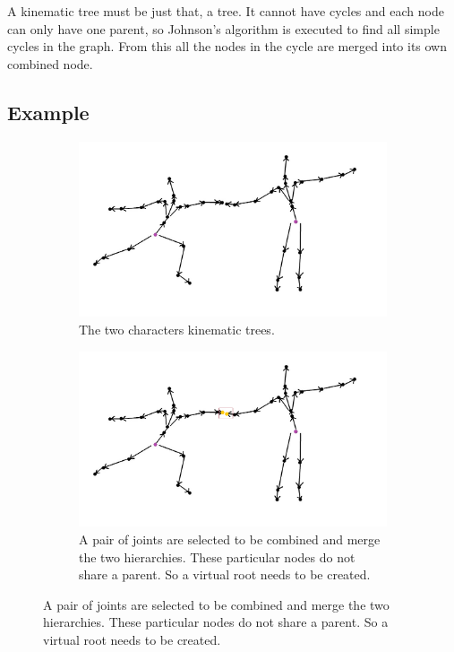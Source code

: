 A kinematic tree must be just that, a tree. It cannot have cycles and each node can only have one parent, so Johnson's algorithm is executed to find all simple cycles in the graph. From this all the nodes in the cycle are merged into its own combined node.

\subsection{Example}
\begin{figure}[h!]
	\centering
        \begin{subfigure}[b!]{0.6\textwidth}
        	\centering
                \includegraphics[width=\linewidth]{img/algorithm2}
                \caption{The two characters kinematic trees.}
        \end{subfigure}
        \quad
        \begin{subfigure}[b!]{0.6\textwidth}
        	\centering
                \includegraphics[width=\linewidth]{img/algorithm3}
                \caption{A pair of joints are selected to be combined and merge the two hierarchies. These particular nodes do not share a parent. So a virtual root needs to be created.}

\end{subfigure}
\end{figure}
